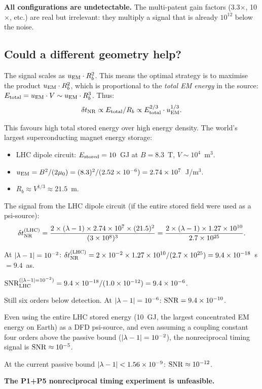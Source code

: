 \textbf{All configurations are undetectable.} The multi-patent gain factors
(3.3$\times$, 10$\times$, etc.) are real but irrelevant: they multiply a
signal that is already $10^{12}$ below the noise.

\subsection{Could a different geometry help?}
\label{ssec:different_geometry}

The signal scales as $u_{\rm EM} \cdot R_b^2$. This means the optimal
strategy is to maximise the product $u_{\rm EM} \cdot R_b^2$, which is
proportional to the \emph{total EM energy} in the source:
$E_{\rm total} = u_{\rm EM} \cdot V \sim u_{\rm EM} \cdot R_b^3$. Thus:
\begin{equation}
\delta t_{\rm NR} \propto E_{\rm total} / R_b
\propto E_{\rm total}^{2/3} \cdot u_{\rm EM}^{1/3}.
\label{eq:scaling_geometry}
\end{equation}

This favours high total stored energy over high energy density. The
world's largest superconducting magnet energy storage:
\begin{itemize}[nosep]
\item LHC dipole circuit: $E_{\rm stored} = 10$~GJ at $B = 8.3$~T,
  $V \sim 10^4$~m$^3$.
\item $u_{\rm EM} = B^2/(2\mu_0) = (8.3)^2/(2.52\times 10^{-6}) = 2.74\times 10^{7}$~J/m$^3$.
\item $R_b \approx V^{1/3} \approx 21.5$~m.
\end{itemize}

The signal from the LHC dipole circuit (if the entire stored field were
used as a psi-source):
\begin{equation}
\delta t_{\rm NR}^{(\rm LHC)} = \frac{2 \times (\lambda-1) \times 2.74\times 10^{7}
\times (21.5)^2}{(3\times 10^{8})^3}
= \frac{2 \times (\lambda-1) \times 1.27\times 10^{10}}{2.7\times 10^{25}}.
\label{eq:LHC_signal}
\end{equation}

At $|\lambda - 1| = 10^{-2}$:
$\delta t_{\rm NR}^{(\rm LHC)} = 2 \times 10^{-2} \times 1.27\times 10^{10}/(2.7\times 10^{25})
= 9.4\times 10^{-18}$~s $= 9.4$~as.

$\mathrm{SNR}_{\rm LHC}^{(|\lambda - 1|=10^{-2})} = 9.4\times 10^{-18}/(1.0\times 10^{-12}) = 9.4\times 10^{-6}$.

Still six orders below detection. At $|\lambda - 1| = 10^{-6}$: $\mathrm{SNR} = 9.4\times 10^{-10}$.

\begin{theorem}
\label{thm:no_source}
Even using the entire LHC stored energy (10~GJ, the largest concentrated
EM energy on Earth) as a DFD psi-source, and even assuming a coupling
constant four orders above the passive bound ($|\lambda - 1| = 10^{-2}$), the
nonreciprocal timing signal is $\mathrm{SNR} \approx 10^{-5}$.

At the current passive bound $|\lambda - 1| < 1.56\times 10^{-9}$:
$\mathrm{SNR} \approx 10^{-12}$.

\textbf{The P1+P5 nonreciprocal timing experiment is unfeasible.}
\end{theorem}


